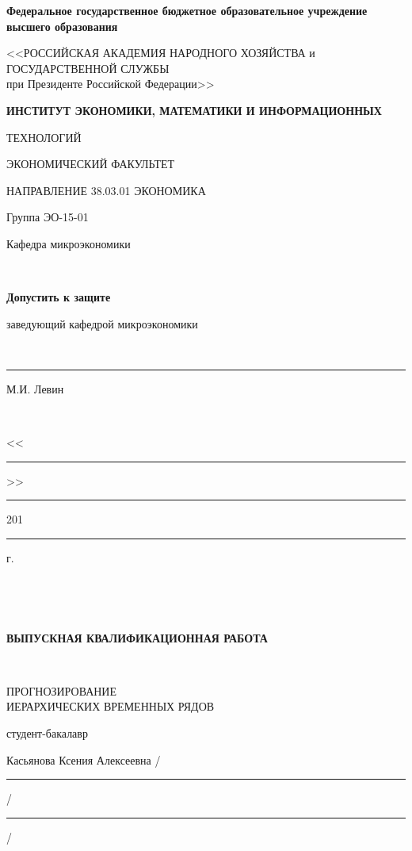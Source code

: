 \documentclass[12pt,a4paper, oneside]{extreport}
\begin{document}

\thispagestyle{empty} %

\begingroup
{}   %
\begin{center}
\small \bfseries Федеральное государственное бюджетное образовательное учреждение высшего образования

<<РОССИЙСКАЯ АКАДЕМИЯ НАРОДНОГО ХОЗЯЙСТВА и\\ ГОСУДАРСТВЕННОЙ СЛУЖБЫ \\
при Президенте Российской Федерации>>

\vspace{2ex}

\bfseries
ИНСТИТУТ ЭКОНОМИКИ, МАТЕМАТИКИ И ИНФОРМАЦИОННЫХ 

ТЕХНОЛОГИЙ
 
 ЭКОНОМИЧЕСКИЙ ФАКУЛЬТЕТ 
 
НАПРАВЛЕНИЕ 38.03.01 ЭКОНОМИКА

\end{center}

\vfill


\noindent  Группа ЭО-15-01
\hfill
\parbox[t]{20em}{\centering
Кафедра микроэкономики

\mbox{ }

\textbf{Допустить к защите}

заведующий кафедрой микроэкономики

\mbox{ }

\rule{8em}{0.5pt} М.И. Левин

\mbox{ }

<<\rule{2em}{0.5pt}>> \rule{5em}{0.5pt} 201\rule{1em}{0.5pt} г. }

\mbox{ }

\mbox{ }

\begin{center}\bfseries
ВЫПУСКНАЯ КВАЛИФИКАЦИОННАЯ РАБОТА

\mbox{ }

\large
ПРОГНОЗИРОВАНИЕ   \\
ИЕРАРХИЧЕСКИХ ВРЕМЕННЫХ РЯДОВ
\end{center}

\vfill

\noindent\normalsize
студент-бакалавр

\noindent
Касьянова Ксения Алексеевна
\hfill /\rule{6em}{0.5pt}/\rule{6em}{0.5pt}/
\end{document}
